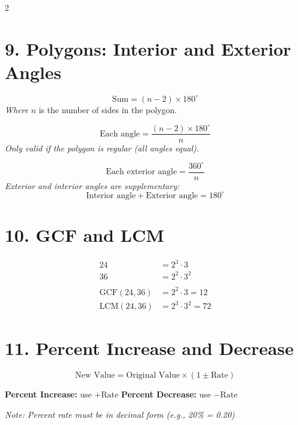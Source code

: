 \documentclass[12pt]{article}
\begin{document}
\begin{multicols}{2}
\section*{9. Polygons: Interior and Exterior Angles}

\begin{tcolorbox}[title=Sum of Interior Angles]
\[
\text{Sum} = (n - 2) \times 180^\circ
\]
\textit{Where } \( n \) is the number of sides in the polygon.
\end{tcolorbox}

\begin{tcolorbox}[title=Each Interior Angle (Regular Polygon)]
\[
\text{Each angle} = \frac{(n - 2) \times 180^\circ}{n}
\]
\textit{Only valid if the polygon is regular (all angles equal).}
\end{tcolorbox}

\begin{tcolorbox}[title=Each Exterior Angle (Regular Polygon)]
\[
\text{Each exterior angle} = \frac{360^\circ}{n}
\]
\textit{Exterior and interior angles are supplementary: } \\
\[
\text{Interior angle} + \text{Exterior angle} = 180^\circ
\]
\end{tcolorbox}

\section*{10. GCF and LCM}

\begin{tcolorbox}[title=GCF and LCM from a Venn Diagram Example]
\[
\begin{aligned}
24 &= 2^3 \cdot 3 \\
36 &= 2^2 \cdot 3^2 \\
\\
\text{GCF}(24, 36) &= 2^2 \cdot 3 = 12 \\
\text{LCM}(24, 36) &= 2^3 \cdot 3^2 = 72
\end{aligned}
\]
\end{tcolorbox}



\section*{11. Percent Increase and Decrease}
\begin{tcolorbox}[title=Percent Increase and Decrease]
\[
\text{New Value} = \text{Original Value} \times (1 \pm \text{Rate})
\]

\textbf{Percent Increase:} use \( + \text{Rate} \) \quad
\textbf{Percent Decrease:} use \( - \text{Rate} \)

\textit{Note: Percent rate must be in decimal form (e.g., 20\% = 0.20)}
\end{tcolorbox}



\end{multicols}
\end{document}
